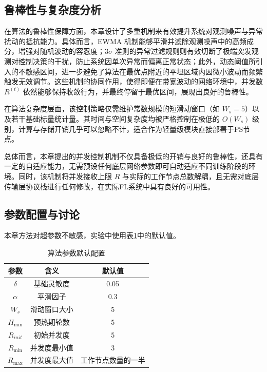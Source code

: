 \documentclass[master, vlined]{DissertUESTC}
\begin{document}
	\subsection{鲁棒性与复杂度分析}

	在算法的鲁棒性保障方面，本章设计了多重机制来有效提升系统对观测噪声与异常扰动的抵抗能力。具体而言，EWMA 机制能够平滑并滤除观测噪声中的高频成分，增强对随机波动的容忍度；$3\sigma$ 准则的异常过滤规则则有效切断了极端突发观测对控制决策的干扰，防止系统因单次异常而偏离正常状态；此外，动态阈值所引入的不敏感区间，进一步避免了算法在最优点附近的平坦区域内因微小波动而频繁触发无效调节。这些机制的协同作用，使得即便在带宽波动的网络环境中，并发数 $R^{(t)}$ 依然能够保持收敛行为，并最终停留于最优区间，展现出良好的鲁棒性。

	在算法复杂度层面，该控制策略仅需维护常数规模的短滑动窗口（如 $W_s=5$）以及若干基础标量统计量。其时间与空间复杂度均被严格控制在极低的 $O(W_s)$ 级别，计算与存储开销几乎可以忽略不计，适合作为轻量级模块直接部署于PS节点。

	总体而言，本章提出的并发控制机制不仅具备极低的开销与良好的鲁棒性，还具有一定的自适应能力，无需预设任何底层网络参数即可自动适应不同训练阶段的环境。同时，该机制将并发接收上限 $R$ 与实际的工作节点总数解耦，且无需对底层传输层协议栈进行任何修改，在实际FL系统中具有良好的可用性。

	\subsection{参数配置与讨论}

	本章方法对超参数不敏感，实验中使用表\ref{tab:params}中的默认值。

	\begin{table}[!htb]
		\centering
		\caption{算法参数默认配置}
		\label{tab:params}
		\begin{tabular}{|c|c|c|}
			\hline
			\textbf{参数} & \textbf{含义} & \textbf{默认值} \\
			\hline
			$\delta$ & 基础灵敏度 & 0.05 \\
			$\alpha$ & 平滑因子 & 0.3 \\
			$W_s$ & 滑动窗口大小 & 5 \\
			$H_{\min}$ & 预热期轮数 & 5 \\
			$R_{init}$ & 初始并发度 & 5\\
			$R_{\min}$ & 并发度最小值 & 3 \\
			$R_{\max}$ & 并发度最大值 & 工作节点数量的一半 \\
			\hline
		\end{tabular}
	\end{table}
\end{document}
